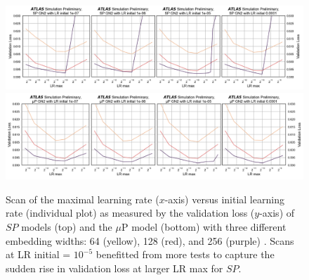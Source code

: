 \begin{figure}[h!]
  \centering
  \includegraphics[width=\textwidth]{Images/FTAG/GN/HPO/fullSP2.png}\\
  \includegraphics[width=\textwidth]{Images/FTAG/GN/HPO/fullmup2.png}
  \caption{Scan of the maximal learning rate ($x$-axis) versus initial learning rate (individual plot) as measured by the validation loss ($y$-axis) of $SP$ models (top) and the $\mu$P model (bottom) with three different embedding widths: 64 (yellow), 128 (red), and 256 (purple) \cite{publicplotMUP}. Scans at LR initial = $10^{-5}$ benefitted from more tests to capture the sudden rise in validation loss at larger LR max for $SP$.}
  \label{fig:fullSPmup}
\end{figure} 

